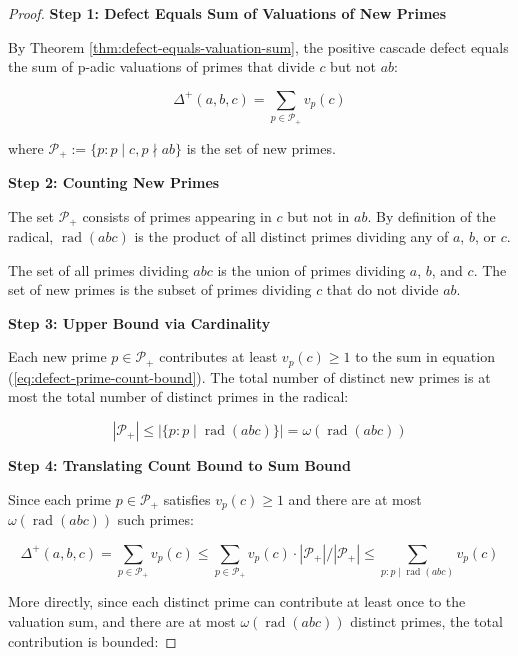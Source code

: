 \begin{proof}

\noindent \textbf{Step 1: Defect Equals Sum of Valuations of New Primes}

By Theorem \ref{thm:defect-equals-valuation-sum}, the positive cascade defect equals the sum of p-adic valuations of primes that divide $c$ but not $ab$:

\begin{equation}
\Delta^{+}(a,b,c) = \sum_{p \in \mathcal{P}_+} v_p(c)
\end{equation}

where $\mathcal{P}_+ := \{p : p \mid c, p \nmid ab\}$ is the set of new primes.

\noindent \textbf{Step 2: Counting New Primes}

The set $\mathcal{P}_+$ consists of primes appearing in $c$ but not in $ab$. By definition of the radical, $\operatorname{rad}(abc)$ is the product of all distinct primes dividing any of $a$, $b$, or $c$.

The set of all primes dividing $abc$ is the union of primes dividing $a$, $b$, and $c$. The set of new primes is the subset of primes dividing $c$ that do not divide $ab$.

\noindent \textbf{Step 3: Upper Bound via Cardinality}

Each new prime $p \in \mathcal{P}_+$ contributes at least $v_p(c) \geq 1$ to the sum in equation (\ref{eq:defect-prime-count-bound}). The total number of distinct new primes is at most the total number of distinct primes in the radical:

\begin{equation}
|\mathcal{P}_+| \leq |\{p : p \mid \operatorname{rad}(abc)\}| = \omega(\operatorname{rad}(abc))
\end{equation}

\noindent \textbf{Step 4: Translating Count Bound to Sum Bound}

Since each prime $p \in \mathcal{P}_+$ satisfies $v_p(c) \geq 1$ and there are at most $\omega(\operatorname{rad}(abc))$ such primes:

\begin{equation}
\Delta^{+}(a,b,c) = \sum_{p \in \mathcal{P}_+} v_p(c) \leq \sum_{p \in \mathcal{P}_+} v_p(c) \cdot |\mathcal{P}_+| / |\mathcal{P}_+| \leq \sum_{p: p \mid \operatorname{rad}(abc)} v_p(c)
\end{equation}

More directly, since each distinct prime can contribute at least once to the valuation sum, and there are at most $\omega(\operatorname{rad}(abc))$ distinct primes, the total contribution is bounded:


\end{proof}
